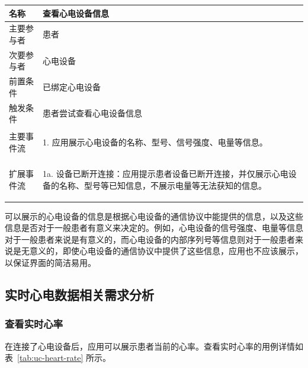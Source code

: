 \begin{table}[!ht]
    \label{tab:uc-view-device-info}
    \begin{tabularx}{\textwidth}{|l|X|}
        \hline
        名称    & 查看心电设备信息     \\
        \hline
        主要参与者 & 患者           \\
        \hline
        次要参与者 & 心电设备         \\
        \hline
        前置条件  & 已绑定心电设备      \\
        \hline
        触发条件  & 患者尝试查看心电设备信息 \\
        \hline
        主要事件流 &
        \begin{itemizec}
            \item[1.] 应用展示心电设备的名称、型号、信号强度、电量等信息。
        \end{itemizec} \\
        \hline
        扩展事件流 &
        \begin{itemizec}
            \item[1a.] 设备已断开连接：应用提示患者设备已断开连接，并仅展示心电设备的名称、型号等已知信息，不展示电量等无法获知的信息。
        \end{itemizec} \\
        \hline
    \end{tabularx}
\end{table}

可以展示的心电设备的信息是根据心电设备的通信协议中能提供的信息，以及这些信息是否对于一般患者有意义来决定的。例如，心电设备的信号强度、电量等信息对于一般患者来说是有意义的，而心电设备的内部序列号等信息则对于一般患者来说是无意义的，即使心电设备的通信协议中提供了这些信息，应用也不应该展示，以保证界面的简洁易用。

\subsection{实时心电数据相关需求分析}\label{subsec:real-time-req}

\subsubsection{查看实时心率}

在连接了心电设备后，应用可以展示患者当前的心率。查看实时心率的用例详情如表~\ref{tab:uc-heart-rate} 所示。

